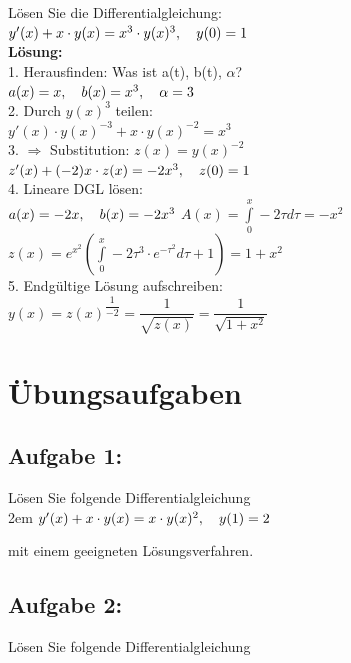 \documentclass[11pt,final]{scrreprt}
\newcommand{\br} {\medskip\\}
\newcommand{\gbr} {\bigskip\\}
\begin{document}
Lösen Sie die Differentialgleichung:\br
\hspace*{4em}$y'(x) + x\cdot y(x) = x^3 \cdot y(x)^3,\hspace*{1em} y(0) = 1 $\br
\textbf{Lösung:}\br
1. Herausfinden: Was ist a(t), b(t), $\alpha$?\\
\hspace*{2em}$a(x) = x , \hspace*{1em}b(x) = x^3 , \hspace*{1em}\alpha = 3$\br
2. Durch $y(x)^3$ teilen:\\
\hspace*{2em}$y'(x)\cdot y(x)^{-3} + x\cdot y(x)^{-2} = x^3$\gbr
3. $\Rightarrow $ Substitution: $z(x) = y(x)^{-2}$\\
\hspace*{2em}$ z'(x) + (-2)x\cdot z(x) = -2x^3, \hspace*{1em} z(0) = 1 $\gbr
4. Lineare DGL lösen:\\
\hspace*{2em}$ a(x) = -2x , \hspace*{1em}b(x) = -2x^3 $
\hspace*{2em}$ A(x) = \int\limits_0^x -2\tau d\tau = -x^2 $\\
\hspace*{2em}$ z(x) = e^{x^2}\left( \int\limits_0^x -2\tau^3\cdot e^{-\tau^2} d\tau + 1 \right) = 1+x^2 $\gbr
5. Endgültige Lösung aufschreiben:\\
\hspace*{2em}$y(x) = z(x)^{\dfrac{1}{-2}} = \dfrac{1}{\sqrt{z(x)}} = \dfrac{1}{\sqrt{1+x^2}}$

\newpage
\section{Übungsaufgaben}

\subsection*{Aufgabe 1:}
Lösen Sie folgende Differentialgleichung \\

\begingroup
\leftskip2em 
$y'(x) + x\cdot y(x) = x\cdot y(x)^2,\hspace*{1em} y(1) = 2$\\
\par	
\endgroup 
mit einem geeigneten Lösungsverfahren.

\subsection*{Aufgabe 2:}
Lösen Sie folgende Differentialgleichung \\
\end{document}
